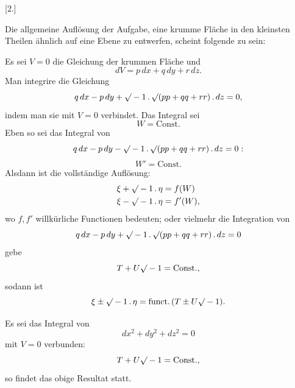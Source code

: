 %
\begin{center}[2.]\end{center}

Die allgemeine Auflösung der Aufgabe, eine krumme Fläche in den kleinsten Theilen ähnlich auf eine Ebene zu entwerfen, scheint folgende zu sein:

Es sei $V=0$ die Gleichung der krummen Fläche und
\[
dV=p\,dx+q\,dy+r\,dz.
\]
Man integrire die Gleichung
\[
q\,dx-p\,dy+\mathord{\surd}-1\,.\,\mathord{\surd}(pp+qq+rr)\,.\,dz=0,
\]
indem man sie mit $V=0$ verbindet. Das Integral sei
\[
W=\mathrm{Const.}
\]
Eben so sei das Integral von
\[
q\,dx-p\,dy-\mathord{\surd}-1\,.\,\mathord{\surd}(pp+qq+rr)\,.\,dz=0:
\]
\[
W'=\mathrm{Const.}
\]
Alsdann ist die vollständige Auflösung:
\[
\begin{aligned}
\xi+\mathord{\surd}-1\,.\,\eta&=f(W)\\
\xi-\mathord{\surd}-1\,.\,\eta&=f'(W),
\end{aligned}
\]
wo $f,f'$ willkürliche Functionen bedeuten; oder vielmehr die Integration von
\[
q\,dx-p\,dy+\mathord{\surd}-1\,.\,\mathord{\surd}(pp+qq+rr)\,.\,dz=0
\]
gebe
\[
T+U\mathord{\surd}-1=\mathrm{Const.},
\]
sodann ist
\[
\xi\pm\mathord{\surd}-1\,.\,\eta=\mathrm{funct.}\,(T\pm U\mathord{\surd}-1).
\]

Es sei das Integral von
\[
dx^2+dy^2+dz^2=0
\]
mit $V=0$ verbunden:
\[
T+U\mathord{\surd}-1=\mathrm{Const.},
\]
so findet das obige Resultat statt.
